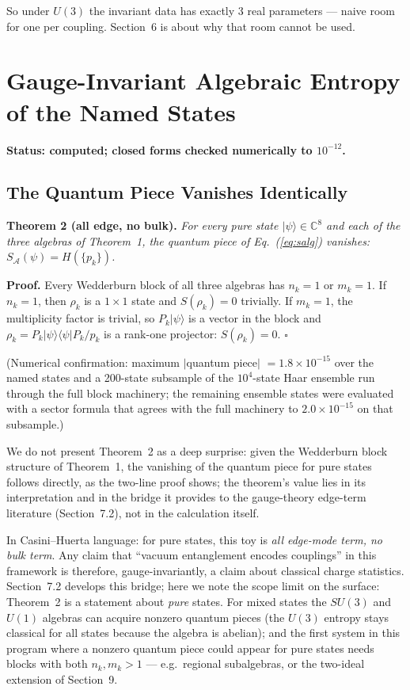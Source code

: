 \documentclass[11pt]{article}
\newcommand{\CC}{\mathbb{C}}
\newcommand{\SA}{S_{\mathcal{A}}}
\begin{document}
So under $U(3)$ the invariant data has exactly 3 real parameters --- naive room for one per coupling. Section~6 is about why that room cannot be used.

\section{Gauge-Invariant Algebraic Entropy of the Named States}

\textbf{Status: computed; closed forms checked numerically to $10^{-12}$.}

\subsection{The Quantum Piece Vanishes Identically}

\textbf{Theorem 2 (all edge, no bulk).} \emph{For every pure state $|\psi\rangle \in \CC^8$ and each of the three algebras of Theorem~1, the quantum piece of Eq.~(\ref{eq:salg}) vanishes: $\SA(\psi) = H(\{p_k\})$.}

\textbf{Proof.} Every Wedderburn block of all three algebras has $n_k = 1$ or $m_k = 1$. If $n_k = 1$, then $\rho_k$ is a $1 \times 1$ state and $S(\rho_k) = 0$ trivially. If $m_k = 1$, the multiplicity factor is trivial, so $P_k|\psi\rangle$ is a vector in the block and $\rho_k = P_k|\psi\rangle\langle\psi|P_k / p_k$ is a rank-one projector: $S(\rho_k) = 0$. \hfill$\square$

(Numerical confirmation: maximum $|$quantum piece$|$ $= 1.8 \times 10^{-15}$ over the named states and a 200-state subsample of the $10^4$-state Haar ensemble run through the full block machinery; the remaining ensemble states were evaluated with a sector formula that agrees with the full machinery to $2.0 \times 10^{-15}$ on that subsample.)

We do not present Theorem~2 as a deep surprise: given the Wedderburn block structure of Theorem~1, the vanishing of the quantum piece for pure states follows directly, as the two-line proof shows; the theorem's value lies in its interpretation and in the bridge it provides to the gauge-theory edge-term literature (Section~7.2), not in the calculation itself.

In Casini--Huerta language: for pure states, this toy is \emph{all edge-mode term, no bulk term}. Any claim that ``vacuum entanglement encodes couplings'' in this framework is therefore, gauge-invariantly, a claim about classical charge statistics. Section~7.2 develops this bridge; here we note the scope limit on the surface: Theorem~2 is a statement about \emph{pure} states. For mixed states the $SU(3)$ and $U(1)$ algebras can acquire nonzero quantum pieces (the $U(3)$ entropy stays classical for all states because the algebra is abelian); and the first system in this program where a nonzero quantum piece could appear for pure states needs blocks with both $n_k, m_k > 1$ --- e.g.\ regional subalgebras, or the two-ideal extension of Section~9.
\end{document}
